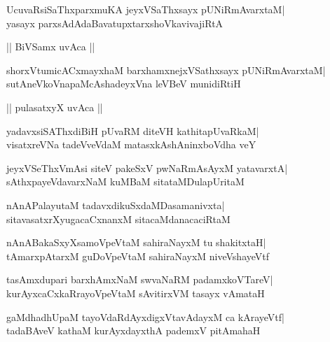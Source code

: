\documentclass[twoside,12pt,openright]{book}
\newcounter{shloka}[chapter]
\begin{document}
\begin{shloka}%
UcuvaRsiSaThxparxmuKA jeyxVSaThxsayx pUNiRmAvarxtaM|\\
yasayx parxsAdAdaBavatupxtarxshoVkavivajiRtA
\end{shloka}

\begin{center}
|| BiVSamx uvAca ||
\end{center}
\begin{shloka}%
shorxVtumicACxmayxhaM barxhamxnejxVSathxsayx pUNiRmAvarxtaM|\\
sutAneVkoVnapaMcAshadeyxVna leVBeV munidiRtiH
\end{shloka}

\begin{center}
|| pulasatxyX uvAca ||
\end{center}
\begin{shloka}%
yadavxsiSAThxdiBiH pUvaRM diteVH kathitapUvaRkaM|\\
visatxreVNa tadeVveVdaM matasxkAshAninxboVdha veY
\end{shloka}

\begin{shloka}%
jeyxVSeThxVmAsi siteV pakeSxV pwNaRmAsAyxM yatavarxtA|\\
sAthxpayeVdavarxNaM kuMBaM sitataMDulapUritaM
\end{shloka}

\begin{shloka}%
nAnAPalayutaM tadavxdikuSxdaMDasamanivxta|\\
sitavasatxrXyugacaCxnanxM sitacaMdanacaciRtaM
\end{shloka}

\begin{shloka}%
nAnABakaSxyXsamoVpeVtaM sahiraNayxM tu shakitxtaH|\\
tAmarxpAtarxM guDoVpeVtaM sahiraNayxM niveVshayeVtf
\end{shloka}

\begin{shloka}%
tasAmxdupari barxhAmxNaM swvaNaRM padamxkoVTareV|\\
kurAyxcaCxkaRrayoVpeVtaM sAvitirxVM tasayx vAmataH
\end{shloka}

\begin{shloka}%
gaMdhadhUpaM tayoVdaRdAyxdigxVtavAdayxM ca kArayeVtf|\\
tadaBAveV kathaM kurAyxdayxthA pademxV pitAmahaH
\end{shloka}
\end{document}
